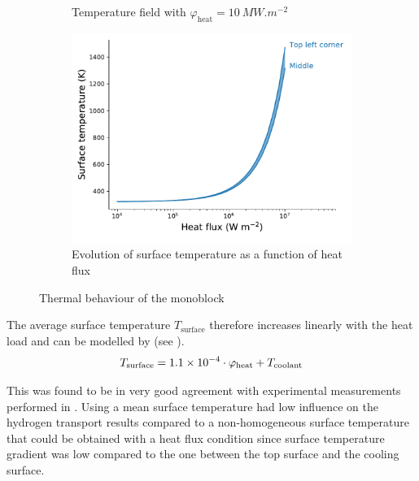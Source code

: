 \begin{figure} [h!]
\begin{subfigure}{0.4\linewidth}
        \caption{Temperature field with $\varphi_\mathrm{heat} = \SI{10}{MW.m^{-2}}$}
    \end{subfigure}
    \begin{subfigure}{0.7\linewidth}
        \centering
        \includegraphics[width=\linewidth]{Figures/Chapter3/monoblocks/parametric_study/temperature_phi_H.pdf}
        \caption{Evolution of surface temperature as a function of heat flux}
    \end{subfigure}
    \caption{Thermal behaviour of the monoblock}
\end{figure}

The average surface temperature $T_\mathrm{surface}$ therefore increases linearly with the heat load and can be modelled by  (see ).
\begin{equation}
    T_\mathrm{surface} = 1.1 \times 10^{-4} \cdot \varphi_\mathrm{heat} + T_\mathrm{coolant}
    \labeq{thermal behaviour law}
\end{equation}

This was found to be in very good agreement with experimental measurements performed in .
Using a mean surface temperature had low influence on the hydrogen transport results compared to a non-homogeneous surface temperature that could be obtained with a heat flux condition since surface temperature gradient was low compared to the one between the top surface and the cooling surface.


